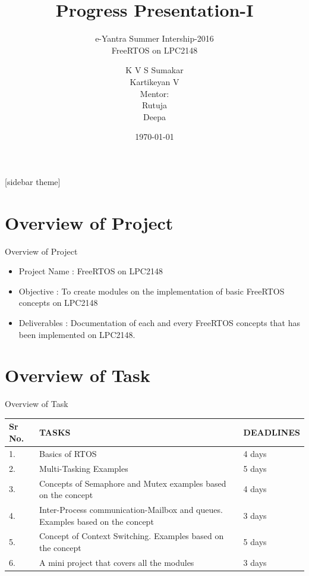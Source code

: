\documentclass[10pt, a4paper]{beamer}
\begin{document}
    \title{Progress Presentation-I}
    \subtitle{e-Yantra Summer Intership-2016 \\ FreeRTOS on LPC2148}
    \author{K V S Sumakar\\Kartikeyan V\\
    Mentor:\\ Rutuja\\Deepa }
    \date{\today}
    \frame{\titlepage}

[sidebar theme]
\section{Overview of Project}
\begin{frame}{Overview of Project}
    
    \begin{itemize}
        \item Project Name : FreeRTOS on LPC2148
        \item Objective : To create modules on the implementation of basic FreeRTOS concepts on LPC2148
        \item Deliverables : Documentation of each and every FreeRTOS concepts that has been implemented on LPC2148.
    \end{itemize}
\end{frame}

\section{Overview of Task}
\begin{frame}{Overview of Task}
    
\begin{center}
\begin{tabular}{ | m{.5cm} | m{5cm}| m{2cm} | } 
\hline
Sr No. & TASKS & DEADLINES \\ 
\hline
1. & Basics of RTOS  & 4 days  \\ 
\hline
2.& Multi-Tasking Examples & 5 days\\ 
\hline
3. & Concepts of Semaphore and Mutex examples based on the concept  & 4 days  \\ 
\hline
4. & Inter-Process communication-Mailbox and queues. Examples based on the concept  & 3 days  \\ 
\hline
5. & Concept of Context Switching. Examples based on the concept  & 5 days  \\ 
\hline
6. & A mini project that covers  all the modules  & 3 days  \\ 
\hline
\end{tabular}
\end{center}
\end{frame}
\end{document}
